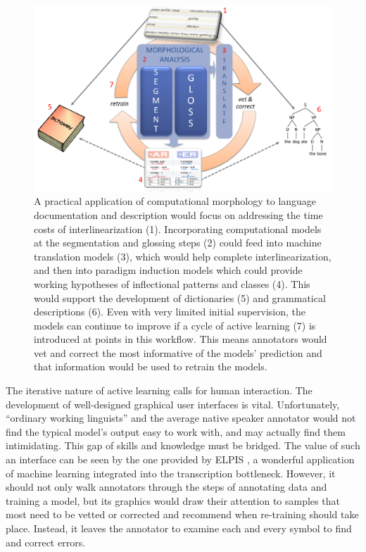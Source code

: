 \documentclass[12pt]{article}
\begin{document}
\begin{figure}[ht]
\label{fig:ML-LDD}
\begin{center}
\includegraphics[width=0.7\columnwidth]{ML-LDD.PNG}
\caption{A practical application of computational morphology to language documentation and description would focus on addressing the time costs of interlinearization (1). Incorporating computational models at the segmentation and glossing steps (2) could feed into machine translation models (3), which would help complete interlinearization, and then into paradigm induction models which could provide working hypotheses of inflectional patterns and classes (4). This would support the development of dictionaries (5) and grammatical descriptions (6). Even with very limited initial supervision, the models can continue to improve if a cycle of active learning (7) is introduced at points in this workflow. This means annotators would vet and correct the most informative of the models' prediction and that information would be used to retrain the models.}
\end{center}
\end{figure}

The iterative nature of active learning calls for human interaction. The development of well-designed graphical user interfaces is vital. Unfortunately, ``ordinary working linguists'' and the average native speaker annotator would not find the typical model's output easy to work with, and may actually find them intimidating. 
This gap of skills and knowledge must be bridged. 
The value of such an interface can be seen by the one provided by ELPIS \cite{foley_elpis_2018}, a wonderful application of machine learning integrated into the transcription bottleneck. However, it should not only walk annotators through the steps of annotating data and training a model, but its graphics would draw their attention to samples that most need to be vetted or corrected and recommend when re-training should take place.
Instead, it leaves the annotator to examine each and every symbol to find and correct errors. 
\end{document}
